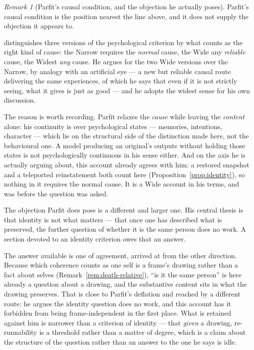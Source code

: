 \documentclass[11pt,a4paper]{article}
\theoremstyle{remark}\newtheorem{remark}[definition]{Remark}
\begin{document}
\begin{remark}[Parfit's causal condition, and the objection he actually poses]\label{rem:parfit}
Parfit's causal condition is the position nearest the line above, and it does not supply the
objection it appears to.

\citet[\S78]{parfit1984} distinguishes three versions of the psychological criterion by what counts as
the right kind of cause: the Narrow requires the \emph{normal} cause, the Wide any \emph{reliable}
cause, the Widest \emph{any} cause. He argues for the two Wide versions over the Narrow, by analogy
with an artificial eye --- a new but reliable causal route delivering the same experiences, of which he
says that even if it is not strictly seeing, what it gives is just as good --- and he adopts the widest
sense for his own discussion.

The reason is worth recording. Parfit relaxes the \emph{cause} while leaving the
\emph{content} alone: his continuity is
over psychological states --- memories, intentions, character --- which lie on the structural side of
the distinction made here, not the behavioural one. A model producing an original's outputs without
holding those states is not psychologically continuous in his sense either. And on the axis he is
actually arguing about, this account already agrees with him: a restored snapshot and a teleported
reinstatement both count here (Proposition~\ref{prop:identity}), so nothing in it requires the normal
cause. It is a Wide account in his terms, and was before the question was asked.

The objection Parfit does pose is a different and larger one.
His central thesis is that identity is not what matters --- that once one has described what is
preserved, the further question of whether it is the same person does no work. A section devoted to an
identity criterion owes that an answer.

The answer available is one of agreement, arrived at from the other direction. Because which coherence
counts as one self is a frame's drawing rather than a fact about selves
(Remark~\ref{rem:death-relative}), ``is it the same person'' is here already a question about a
drawing, and the substantive content sits in what the drawing preserves. That is close to Parfit's
deflation and reached by a different route: he argues the identity question does no work, and this
account has it forbidden from being frame-independent in the first place. What is retained against him
is narrower than a criterion of identity --- that \emph{given} a drawing, re-runnability is a threshold
rather than a matter of degree, which is a claim about the structure of the question rather than an
answer to the one he says is idle.
\end{remark}
\end{document}
